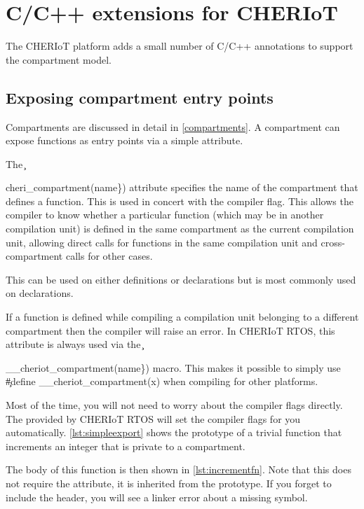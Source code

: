 \chapter[label=language_extensions]{C/C++ extensions for CHERIoT}

The CHERIoT platform adds a small number of C/C++ annotations to support the compartment model.

\section[label=exporting_functions]{Exposing compartment entry points}

Compartments are discussed in detail in \ref{compartments}.
A compartment can expose functions as entry points via a simple attribute.

The \c{cheri_compartment({name\})} attribute specifies the name of the compartment that defines a function.
This is used in concert with the  compiler flag.
This allows the compiler to know whether a particular function (which may be in another compilation unit) is defined in the same compartment as the current compilation unit, allowing direct calls for functions in the same compilation unit and cross-compartment calls for other cases.

This can be used on either definitions or declarations but is most commonly used on declarations.

If a function is defined while compiling a compilation unit belonging to a different compartment then the compiler will raise an error.
In CHERIoT RTOS, this attribute is always used via the \c{__cheriot_compartment({name\})} macro.
This makes it possible to simply use \c{#define __cheriot_compartment(x)} when compiling for other platforms.

Most of the time, you will not need to worry about the compiler flags directly.
The  provided by CHERIoT RTOS will set the compiler flags for you automatically.
\ref{lst:simpleexport} shows the prototype of a trivial function that increments an integer that is private to a compartment.

\codelisting[filename=examples/compartment_annotation/interface.h,marker=compartment_export,label=lst:simpleexport,caption="Exporting a function for use by other compartments from a header."]{}

The body of this function is then shown in \ref{lst:incrementfn}.
Note that this does not require the attribute, it is inherited from the prototype.
If you forget to include the header, you will see a linker error about a missing symbol.

}}

